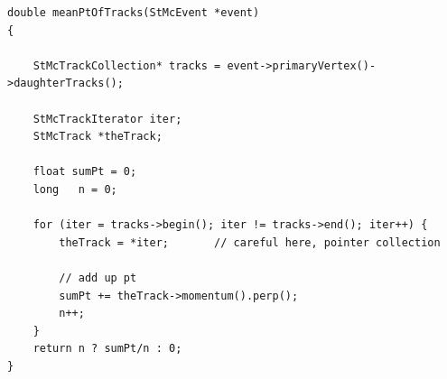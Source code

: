 \begin{Entry}
{\begin{verbatim}
double meanPtOfTracks(StMcEvent *event)
{
    
    StMcTrackCollection* tracks = event->primaryVertex()->daughterTracks();

    StMcTrackIterator iter;
    StMcTrack *theTrack;

    float sumPt = 0;
    long   n = 0;

    for (iter = tracks->begin(); iter != tracks->end(); iter++) {
        theTrack = *iter;       // careful here, pointer collection

        // add up pt
        sumPt += theTrack->momentum().perp();
        n++;
    }
    return n ? sumPt/n : 0;
}
\end{verbatim}
}%

\end{Entry}

%
%
